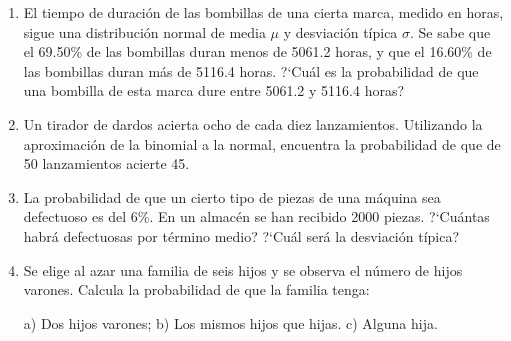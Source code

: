 \begin{adjustwidth}{20pt}{10pt}
\begin{enumerate}[PB. 1. ]
		\hspace{-1cm}\vspace{1cm}
		
		
		
		\item 	El tiempo de duración de las bombillas de una cierta marca, medido en horas, sigue una distribución normal de media $\mu$ y desviación típica $\sigma$. Se sabe que el 69.50\% de las bombillas duran menos de 5061.2 horas, y que el 16.60\% de las bombillas duran más de 5116.4 horas. ?`Cuál es la probabilidad de que una bombilla de esta marca dure entre 5061.2 y 5116.4 horas?
		
		\hspace{-1cm}\vspace{1cm}
		
		
		
		\item 	Un tirador de dardos acierta ocho de cada diez lanzamientos. Utilizando la aproximación de la binomial a la normal, encuentra la probabilidad de que de 50 lanzamientos acierte 45. 
		
		\hspace{-1cm}\vspace{1cm}
		
		\item 	La probabilidad de que un cierto tipo de piezas de una máquina sea defectuoso es del 6\%. En un almacén se han recibido 2000 piezas. ?`Cuántas habrá defectuosas por término medio? ?`Cuál será la desviación típica?

		
		\hspace{-1cm}\vspace{1cm}
		
		
		
		\item 	Se elige al azar una familia de seis hijos y se observa el número de hijos varones. Calcula la probabilidad de que la familia tenga: 

		a) Dos hijos varones; b) Los mismos hijos que hijas. c) Alguna hija.

		
		\hspace{-1cm}\vspace{1cm}
		

\end{enumerate}
\end{adjustwidth}
